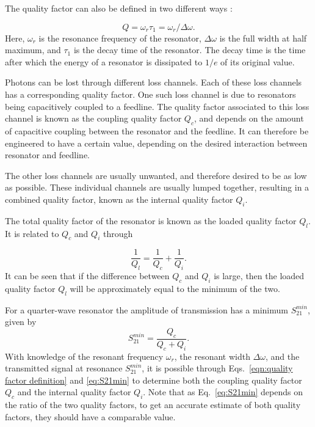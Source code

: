     The quality factor can also be defined in two different ways \cite[pp.23-24]{Mazin}:

    \begin{equation}
        Q = \omega_r \tau_1 = \omega_r / \Delta \omega.
        \label{eqn:quality factor definition}
    \end{equation}
    Here, $\omega_r$ is the resonance frequency of the resonator, $\Delta \omega$ is the full width at half maximum, and $\tau_1$ is the decay time of the resonator. The decay time is the time after which the energy of a resonator is dissipated to $1/e$ of its original value.

    Photons can be lost through different loss channels. Each of these loss channels has a corresponding quality factor. One such loss channel is due to resonators being capacitively coupled to a feedline. The quality factor associated to this loss channel is known as the coupling quality factor $Q_c$, and depends on the amount of capacitive coupling between the resonator and the feedline. It can therefore be engineered to have a certain value, depending on the desired interaction between resonator and feedline.

    The other loss channels are usually unwanted, and therefore desired to be as low as possible. These individual channels are usually lumped together, resulting in a combined quality factor, known as the internal quality factor $Q_i$.

    The total quality factor of the resonator is known as the loaded quality factor $Q_l$. It is related to $Q_c$ and $Q_i$ through

    \begin{equation}
        \frac{1}{Q_l} = \frac{1}{Q_c} + \frac{1}{Q_i}.
        \label{eq:Q_l}
    \end{equation}
    It can be seen that if the difference between $Q_c$ and $Q_i$ is large, then the loaded quality factor $Q_l$ will be approximately equal to the minimum of the two.

    For a quarter-wave resonator the amplitude of transmission has a minimum $S_{21}^{min}$, given by \cite[p29]{Mazin}
    \begin{equation}
        S_{21}^{min} = \frac{Q_c}{Q_c + Q_i}.
        \label{eq:S21min}
    \end{equation}
    With knowledge of the resonant frequency $\omega_r$, the resonant width $\Delta \omega$, and the transmitted signal at resonance $S_{21}^{min}$, it is possible through Eqs.~\ref{eqn:quality factor definition} and \ref{eq:S21min} to determine both the coupling quality factor $Q_c$ and the internal quality factor $Q_i$. Note that as Eq.~\ref{eq:S21min} depends on the ratio of the two quality factors, to get an accurate estimate of both quality factors, they should have a comparable value.

